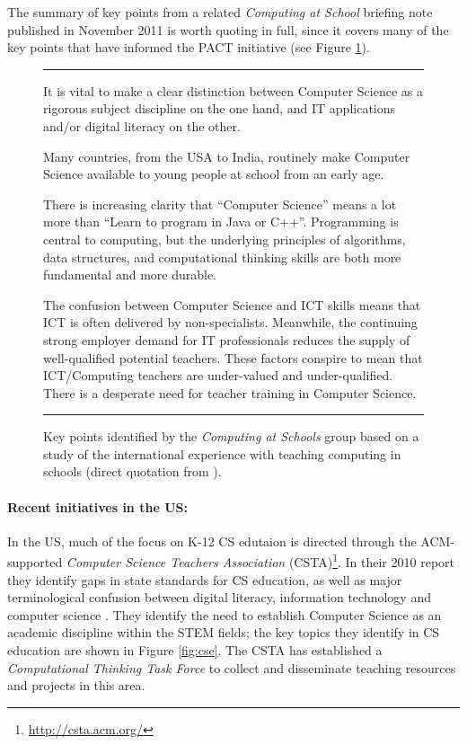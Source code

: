 \documentclass[a4paper]{article}
\def\figline{\rule{\textwidth}{0.3mm}}
\begin{document}
The summary of key points from a related \textit{Computing at School} briefing note published in November 2011 \cite{cat-brief-11} is worth quoting in full, since it covers many of the key points that have informed the PACT initiative (see Figure \ref{fig:points}).  

\begin{figure}
\figline
\begin{compactitem}
\item It is vital to make a clear distinction between Computer Science as a rigorous subject
discipline on the one hand, and IT applications and/or digital literacy on the other.
\item Many countries, from the USA to India, routinely make Computer Science available to young people at school from an early age.
\item There is increasing clarity that ``Computer Science'' means a lot more than ``Learn to program
         in Java or C++''. Programming is central to computing, but the underlying principles of
          algorithms, data structures, and computational thinking skills are both more fundamental
         and more durable.
\item The confusion between Computer Science and ICT skills means that ICT is often delivered by
   non-specialists. Meanwhile, the continuing strong employer demand for IT professionals
  reduces the supply of well-qualified potential teachers. These factors conspire to mean that
 ICT/Computing teachers are under-valued and under-qualified. There is a desperate need
for teacher training in Computer Science.
\end{compactitem}
\figline
\caption{Key points identified by the \textit{Computing at Schools} group based on a study of the international experience with teaching computing in schools (direct quotation from \cite{cat-brief-11}).}
\label{fig:points}
\end{figure}

\paragraph{Recent initiatives in the US:}  

In the US, much of the focus on K-12 CS edutaion is directed through the ACM-supported \textit{Computer Science Teachers Association} (CSTA)\footnote{\url{http://csta.acm.org/}}.  In their 2010 report they identify gaps in state standards for CS education, as well as major terminological confusion between digital literacy, information technology and computer science \cite{csta-roe10}.  They identify the need to establish Computer Science as an academic discipline within the STEM fields; the key topics they identify in CS education are shown in Figure \ref{fig:cse}.
The CSTA has established a \textit{Computational Thinking Task Force} to collect and disseminate teaching resources and projects in this area.
\end{document}
